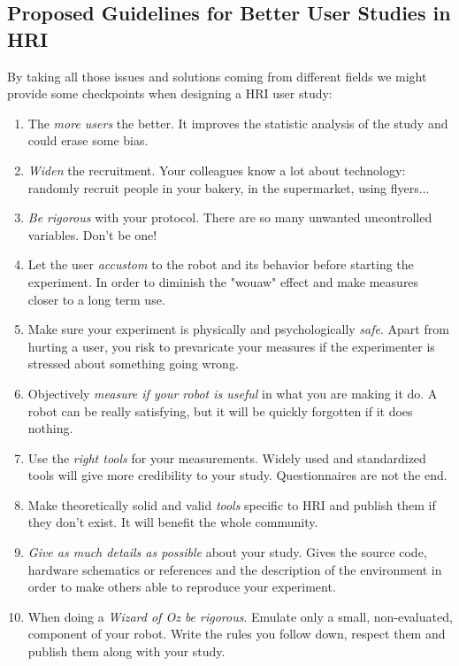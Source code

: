 \documentclass[a4paper,11pt,twoside]{StyleThese}
\begin{document}
\subsection{Proposed Guidelines for Better User Studies in HRI}
By taking all those issues and solutions coming from different fields we might provide some checkpoints when designing a HRI user study:
\begin{enumerate}
    \item The \textit{more users} the better. It improves the statistic analysis of the study and could erase some bias.
    \item \textit{Widen} the recruitment. Your colleagues know a lot about technology: randomly recruit people in your bakery, in the supermarket, using flyers...
    \item \textit{Be rigorous} with your protocol. There are so many unwanted uncontrolled variables. Don't be one!
    \item Let the user \textit{accustom} to the robot and its behavior before starting the experiment. In order to diminish the "wouaw" effect and make measures closer to a long term use.
    \item Make sure your experiment is physically and psychologically \textit{safe}. Apart from hurting a user, you risk to prevaricate your measures if the experimenter is stressed about something going wrong.
    \item Objectively \textit{measure if your robot is useful} in what you are making it do. A robot can be really satisfying, but it will be quickly forgotten if it does nothing.
    \item Use the \textit{right tools} for your measurements. Widely used and standardized tools will give more credibility to your study. Questionnaires are not the end.
    \item Make theoretically solid and valid \textit{tools} specific to HRI and publish them if they don't exist. It will benefit the whole community.
    \item \textit{Give as much details as possible} about your study. Gives the source code, hardware schematics or references and the description of the environment in order to make others able to reproduce your experiment.
    \item When doing a \textit{Wizard of Oz be rigorous}. Emulate only a small, non-evaluated, component of your robot. Write the rules you follow down, respect them and publish them along with your study.
\end{enumerate}
\end{document}

